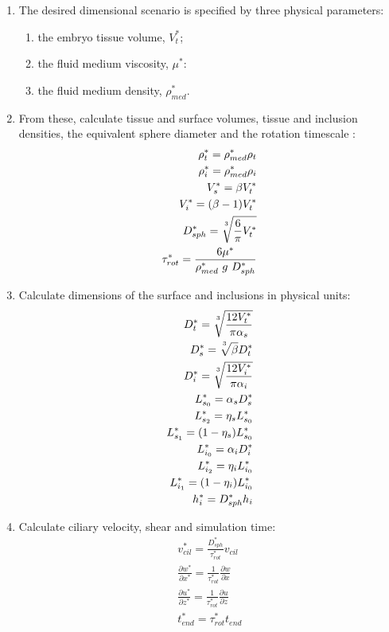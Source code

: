 \documentclass[10pt,a4paper]{article}
\def\non{\nonumber}
\def\p{\partial}
\begin{document}
\begin{enumerate}
	\item The desired dimensional scenario is specified by three physical parameters:
	\begin{enumerate}
		\item the embryo tissue volume, $V_t^*$;
		\item the fluid medium viscosity, $\mu^*$:
		\item the fluid medium density, $\rho^*_{med}$.
	\end{enumerate}
	\item From these, calculate tissue and surface volumes, tissue and inclusion densities, the equivalent sphere diameter and the rotation timescale :
\begin{eqnarray}\label{nd2dpars3}
	\rho^*_t = \rho^*_{med} \rho_t \non \\
	\rho^*_i = \rho^*_{med} \rho_i \non \\
	V_s^* = \beta V_t^* \non \\
	V_i^* = (\beta-1) V_t^* \non \\
	D_{sph}^* = \sqrt[\uproot{5}3]{\frac{6}{\pi} V_t^*} \non \\
	\tau^*_{rot} = \frac{6 \mu^*}{\rho^*_{med} ~ g ~ D_{sph}^*}
\end{eqnarray}
\item Calculate dimensions of the surface and inclusions in physical units:
\begin{eqnarray}\label{nd2dpars4}
	D_t^* = \sqrt[\uproot{5}3]{\frac{12 V_t^*}{\pi \alpha_s}} \non \\
	D_s^* = \sqrt[\uproot{5}3]{\beta} D_t^* \non \\
	D^*_i = \sqrt[\uproot{5}3]{\frac{12 V_i^*}{\pi \alpha_i}} \non \\
	L^*_{s_0} = \alpha_s D^*_s \non \\
	L^*_{s_2} = \eta_s L^*_{s_0} \non \\
	L^*_{s_1} = (1-\eta_s) L^*_{s_0} \non \\
	L^*_{i_0} = \alpha_i D^*_i \non \\
	L^*_{i_2} = \eta_i L^*_{i_0} \non \\
	L^*_{i_1} = (1-\eta_i) L^*_{i_0} \non \\
	h^*_i = D_{sph}^* h_i \non \\
\end{eqnarray}
\item Calculate ciliary velocity, shear and simulation time:
\begin{eqnarray}\label{nd2dpars4a}
	v^*_{cil} = \frac{D_{sph}^*}{{\tau^*_{rot}}}  v_{cil} \non \\
	\frac{\p w^*}{\p x^*} = \frac{1}{\tau^*_{rot}} \frac{\p w}{\p x} \non \\
	\frac{\p u^*}{\p z^*} = \frac{1}{\tau^*_{rot}} \frac{\p u}{\p z} \non \\
	t^*_{end} = \tau^*_{rot} t_{end}
\end{eqnarray}
	

\end{enumerate}
\end{document}
